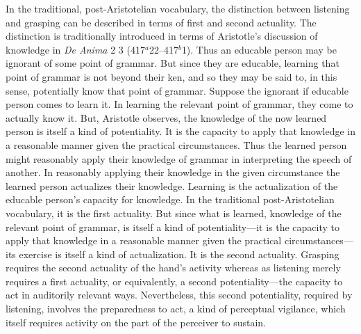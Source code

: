 In the traditional, post-Aristotelian vocabulary, the distinction between listening and grasping can be described in terms of first and second actuality. The distinction is traditionally introduced in terms of Aristotle's discussion of knowledge in \emph{De Anima} 2 3 (417\( ^{a} \)22--417\( ^{b} \)1). Thus an educable person may be ignorant of some point of grammar. But since they are educable, learning that point of grammar is not beyond their ken, and so they may be said to, in this sense, potentially know that point of grammar. Suppose the ignorant if educable person comes to learn it. In learning the relevant point of grammar, they come to actually know it. But, Aristotle observes, the knowledge of the now learned person is itself a kind of potentiality. It is the capacity to apply that knowledge in a reasonable manner given the practical circumstances. Thus the learned person might reasonably apply their knowledge of grammar in interpreting the speech of another. In reasonably applying their knowledge in the given circumstance the learned person actualizes their knowledge. Learning is the actualization of the educable person's capacity for knowledge. In the traditional post-Aristotelian vocabulary, it is the first actuality. But since what is learned, knowledge of the relevant point of grammar, is itself a kind of potentiality---it is the capacity to apply that knowledge in a reasonable manner given the practical circumstances---its exercise is itself a kind of actualization. It is the second actuality. Grasping requires the second actuality of the hand's activity whereas as listening merely requires a first actuality, or equivalently, a second potentiality---the capacity to act in auditorily relevant ways. Nevertheless, this second potentiality, required by listening, involves the preparedness to act, a kind of perceptual vigilance, which itself requires activity on the part of the perceiver to sustain.


